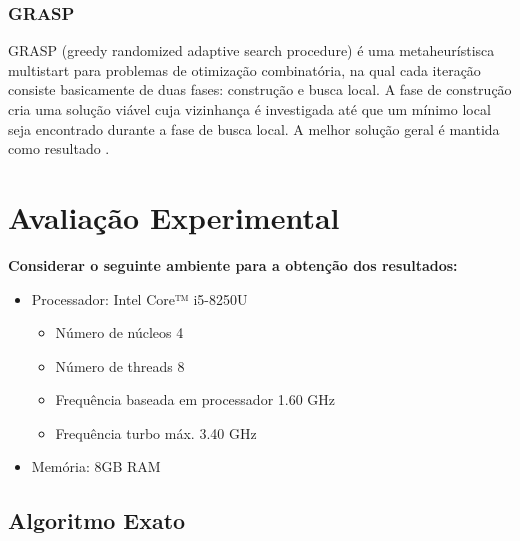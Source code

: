 \documentclass[a4paper, 12pt]{article}
\begin{document}
\subsubsection{GRASP}

GRASP (greedy randomized adaptive search procedure) é uma metaheurístisca multistart para 
problemas de otimização combinatória, na qual cada iteração consiste basicamente de duas fases: construção e busca local. 
A fase de construção cria uma solução viável cuja vizinhança é investigada até que um mínimo local seja 
encontrado durante a fase de busca local. A melhor solução geral é mantida como resultado \cite{feo1995greedy}.


\clearpage
\section{Avaliação Experimental}

{\bf Considerar o seguinte ambiente para a obtenção dos resultados:}
\begin{itemize}
    \item Processador: Intel Core™ i5-8250U
    \begin{itemize}
        \item Número de núcleos 4
        \item Número de threads 8
        \item Frequência baseada em processador 1.60 GHz
        \item Frequência turbo máx. 3.40 GHz
    \end{itemize}
    \item Memória: 8GB RAM
\end{itemize}

\subsection{Algoritmo Exato}
\end{document}
